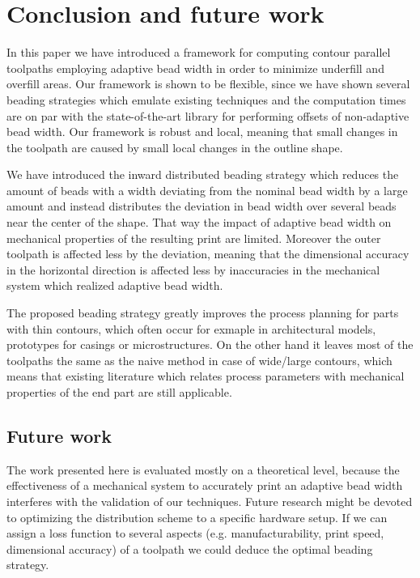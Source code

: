 \section{Conclusion and future work}
In this paper we have introduced a framework for computing contour parallel toolpaths employing adaptive bead width in order to minimize underfill and overfill areas.
Our framework is shown to be flexible, since we have shown several beading strategies which emulate existing techniques and the computation times are on par with the state-of-the-art library for performing offsets of non-adaptive bead width.
Our framework is robust and local, meaning that small changes in the toolpath are caused by small local changes in the outline shape.

We have introduced the inward distributed beading strategy which reduces the amount of beads with a width deviating from the nominal bead width by a large amount
and instead distributes the deviation in bead width over several beads near the center of the shape.
That way the impact of adaptive bead width on mechanical properties of the resulting print are limited.
Moreover the outer toolpath is affected less by the deviation, meaning that the dimensional accuracy in the horizontal direction is affected less by inaccuracies in the mechanical system which realized adaptive bead width.

The proposed beading strategy greatly improves the process planning for parts with thin contours, which often occur for exmaple in architectural models, prototypes for casings or microstructures.
On the other hand it leaves most of the toolpaths the same as the naive method in case of wide/large contours, which means that existing literature which relates process parameters with mechanical properties of the end part are still applicable.


\subsection{Future work}
The work presented here is evaluated mostly on a theoretical level, because the effectiveness of a mechanical system to accurately print an adaptive bead width interferes with the validation of our techniques.
Future research might be devoted to optimizing the distribution scheme to a specific hardware setup.
If we can assign a loss function to several aspects (e.g. manufacturability, print speed, dimensional accuracy) of a toolpath we could deduce the optimal beading strategy.

